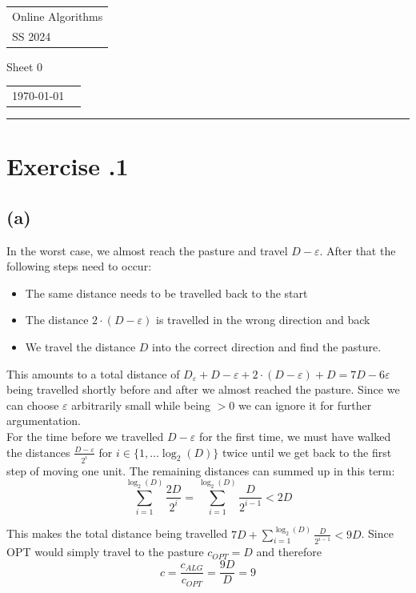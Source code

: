 \documentclass[a4paper,12pt]{scrartcl}
\renewcommand{\epsilon}{\varepsilon}
\newcounter{sheet}
\newcommand{\printsheet}{\arabic{sheet}}
\newcommand{\printmembers}{}
\newcommand{\mal}{\cdot}
\begin{document}
{\raggedright
\begin{tabular}{l}
    Online Algorithms \\
    SS 2024 \\
\end{tabular}}
\hfill
{\Large Sheet 0\printsheet}
\hfill
\begin{tabular}{l l}
\today{} \\
\printmembers
\end{tabular}
\hrule



\section*{Exercise \printsheet.1}
\subsection*{(a)}
In the worst case, we almost reach the pasture and travel $D-\epsilon$. After that the following steps need to occur:
\begin{itemize}
\item The same distance needs to be travelled back to the start 
\item The distance $2 \mal (D-\epsilon)$ is travelled in the wrong direction and back
\item We travel the distance $D$ into the correct direction and find the pasture.
\end{itemize} 
This amounts to a total distance of $D_\epsilon + D -\epsilon + 2 \mal (D-\epsilon) + D = 7D - 6\epsilon$ being travelled shortly before and after we almost reached the pasture. Since we can choose $\epsilon$ arbitrarily small while being $>0$ we can ignore it for further argumentation. \\

For the time before we travelled $D-\epsilon$ for the first time, we must have walked the distances $\frac{D-\epsilon}{2^i}$ for $i \in \{1,\dots \log_2(D)\}$ twice until we get back to the first step of moving one unit.
The remaining distances can summed up in this term:
\[\sum_{i=1}^{\log_2(D)} \frac{2D}{2^{i}} = \sum_{i=1}^{\log_2(D)} \frac{D}{2^{i-1}} < 2D\]

This makes the total distance being travelled $7D + \sum_{i=1}^{\log_2(D)} \frac{D}{2^{i-1}} < 9D$. Since OPT would simply travel to the pasture $c_{OPT}=D$ and therefore \[c = \frac{c_{ALG}}{c_{OPT}} = \frac{9D}{D} = 9\]
\end{document}
